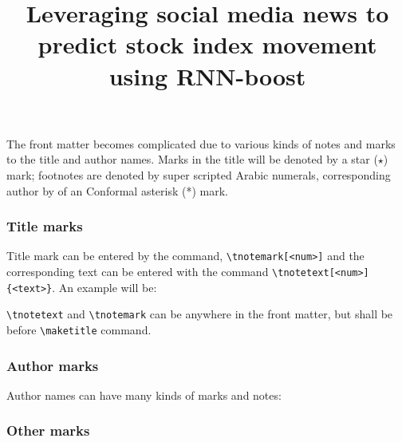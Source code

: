 \documentclass[a4paper,12pt]{article}
\begin{document}
The front matter becomes complicated due to various kinds
of notes and marks to the title and author names. Marks in
the title will be denoted by a star ($\star$) mark;
footnotes are denoted by super scripted Arabic numerals,
corresponding author by of an Conformal asterisk (*) mark.

\subsubsection{Title marks}

Title mark can be entered by the command, \verb+\tnotemark[<num>]+
and the corresponding text can be entered with the command
\verb+\tnotetext[<num>]+ \verb+{<text>}+. An example will be:

\begin{vquote}
\title[mode=title]{Leveraging social media news to predict
                      stock index movement using RNN-boost}

\tnotemark[1,2]


\end{vquote}

\verb+\tnotetext+ and \verb+\tnotemark+ can be anywhere in
the front matter, but shall be before \verb+\maketitle+ command.

\subsubsection{Author marks}

Author names can have many kinds of marks and notes:


\subsubsection{Other marks}
\end{document}
